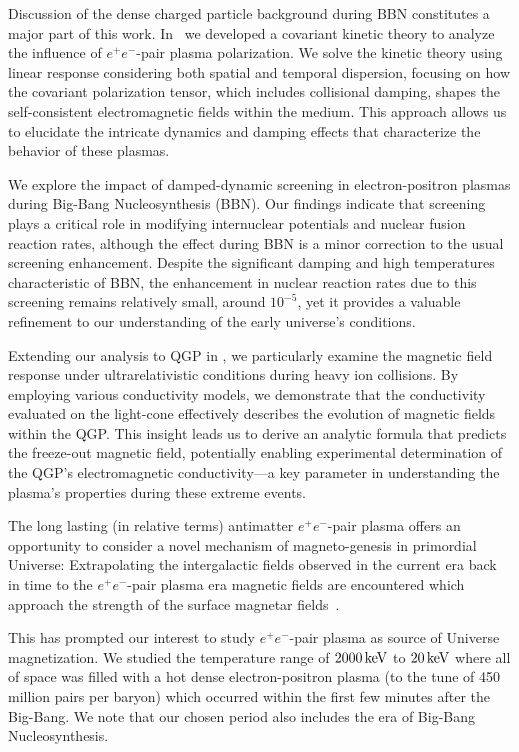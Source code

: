 Discussion of the dense charged particle background during BBN constitutes a major part of this work. In~ we developed a covariant kinetic theory to analyze the influence of $e^+e^-$-pair plasma polarization. We solve the kinetic theory using linear response considering both spatial and temporal dispersion, focusing on how the covariant polarization tensor, which includes collisional damping, shapes the self-consistent electromagnetic fields within the medium. This approach allows us to elucidate the intricate dynamics and damping effects that characterize the behavior of these plasmas.

We explore the impact of damped-dynamic screening in electron-positron plasmas during Big-Bang Nucleosynthesis (BBN). Our findings indicate that screening plays a critical role in modifying internuclear potentials and nuclear fusion reaction rates, although the effect during BBN is a minor correction to the usual screening enhancement. Despite the significant damping and high temperatures characteristic of BBN, the enhancement in nuclear reaction rates due to this screening remains relatively small, around $10^{-5}$, yet it provides a valuable refinement to our understanding of the early universe's conditions.

Extending our analysis to QGP in , we particularly examine the magnetic field response under ultrarelativistic conditions during heavy ion collisions. By employing various conductivity models, we demonstrate that the conductivity evaluated on the light-cone effectively describes the evolution of magnetic fields within the QGP. This insight leads us to derive an analytic formula that predicts the freeze-out magnetic field, potentially enabling experimental determination of the QGP's electromagnetic conductivity—a key parameter in understanding the plasma's properties during these extreme events.


The long lasting (in relative terms) antimatter $e^+e^-$-pair  plasma offers an opportunity to consider a novel mechanism of magneto-genesis in primordial Universe: Extrapolating the intergalactic fields observed in the current era back in time to the $e^+e^-$-pair plasma era magnetic fields are encountered which approach the strength of the surface magnetar fields~.  

This has prompted our interest to study $e^+e^-$-pair plasma as source of Universe magnetization. We studied the temperature range of $2000\text{\,keV}$ to $20\text{\,keV}$ where all of space was filled with a hot dense electron-positron plasma (to the tune of 450 million pairs per baryon) which occurred within the first few minutes after the Big-Bang. We note that our chosen period also includes the era of Big-Bang Nucleosynthesis.

